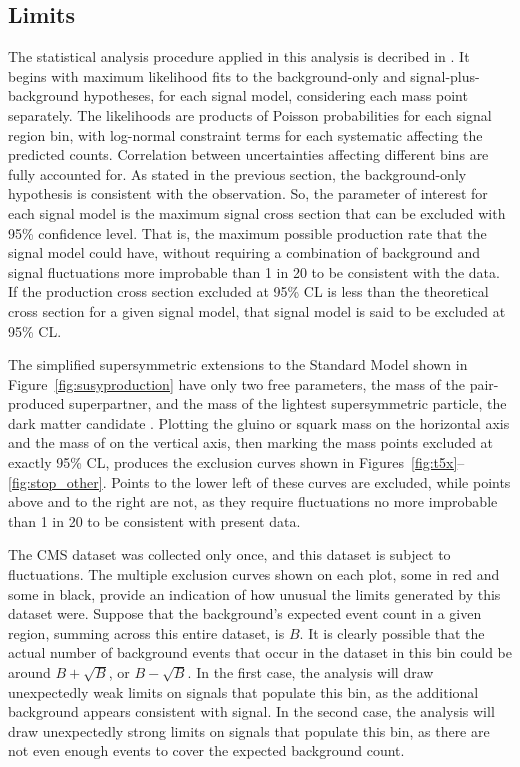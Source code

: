  \subsection{Limits} \label{sec:MT2limits}

  The \CL statistical analysis procedure applied in this analysis is decribed in \cite{CLS_method}.
  It begins with maximum likelihood fits to the background-only and signal-plus-background hypotheses, for each signal model, considering each mass point separately. 
  The likelihoods are products of Poisson probabilities for each signal region bin, with log-normal constraint terms for each systematic affecting the predicted counts.
  Correlation between uncertainties affecting different bins are fully accounted for.
  As stated in the previous section, the background-only hypothesis is consistent with the observation.
  So, the parameter of interest for each signal model is the maximum signal cross section that can be excluded with 95\% confidence level.
  That is, the maximum possible production rate that the signal model could have, without requiring a combination of background and signal fluctuations more improbable than 1 in 20 to be consistent with the data.
  If the production cross section excluded at 95\% CL is less than the theoretical cross section for a given signal model, that signal model is said to be excluded at 95\% CL.

  The simplified supersymmetric extensions to the Standard Model shown in Figure~\ref{fig:susyproduction} have only two free parameters, the mass of the pair-produced superpartner, and the mass of the lightest supersymmetric particle, the dark matter candidate \lsp.
  Plotting the gluino or squark mass on the horizontal axis and the mass of \lsp on the vertical axis, then marking the mass points excluded at exactly 95\% CL, produces the exclusion curves shown in Figures~\ref{fig:t5x}--\ref{fig:stop_other}.
  Points to the lower left of these curves are excluded, while points above and to the right are not, as they require fluctuations no more improbable than 1 in 20 to be consistent with present data.

  The CMS dataset was collected only once, and this dataset is subject to fluctuations.
  The multiple exclusion curves shown on each plot, some in red and some in black, provide an indication of how unusual the limits generated by this dataset were.
  Suppose that the background's expected event count in a given region, summing across this entire dataset, is $B$.
  It is clearly possible that the actual number of background events that occur in the dataset in this bin could be around $B+\sqrt{B}$, or $B-\sqrt{B}$.
  In the first case, the analysis will draw unexpectedly weak limits on signals that populate this bin, as the additional background appears consistent with signal.
  In the second case, the analysis will draw unexpectedly strong limits on signals that populate this bin, as there are not even enough events to cover the expected background count.

